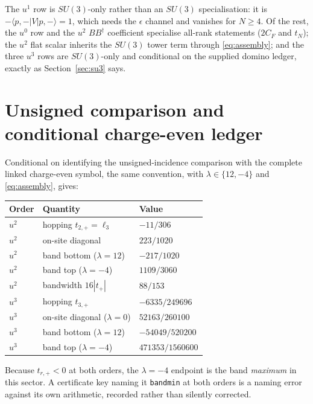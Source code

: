 \documentclass[11pt]{article}
\theoremstyle{plain}
\theoremstyle{definition}
\theoremstyle{remark}
\newcommand{\chk}[1]{}
\newcommand{\CF}{C_F}
\newcommand{\dg}{^{\dagger}}
\begin{document}
The $u^1$ row is $SU(3)$-only rather than an $SU(3)$ specialisation: it is
$-\langle p,-|V|p,-\rangle=1$, which needs the $\epsilon$ channel and vanishes
for $N\ge4$. Of the rest, the $u^0$ row and the $u^2$ $BB\dg$ coefficient
specialise all-rank statements ($2\CF$ and $t_N$); the $u^2$ flat scalar
inherits the $SU(3)$ tower term through \eqref{eq:assembly}; and the three
$u^3$ rows are $SU(3)$-only and conditional on the supplied domino ledger,
exactly as Section~\ref{sec:su3} says.

\section{Unsigned comparison and conditional charge-even ledger}\label{app:even}

Conditional on identifying the unsigned-incidence comparison with the complete
linked charge-even symbol, the same convention, with
$\lambda\in\{12,-4\}$ and \eqref{eq:assembly}, gives:

\begin{center}
\begin{tabular}{@{}lll@{}}
\toprule
Order & Quantity & Value\\
\midrule
$u^2$ & hopping $t_{2,+}=\ell_3$ & $-11/306$\\
$u^2$ & on-site diagonal & $223/1020$\\
$u^2$ & band bottom ($\lambda=12$) & $-217/1020$\\
$u^2$ & band top ($\lambda=-4$) & $1109/3060$\\
$u^2$ & bandwidth $16|t_+|$ & $88/153$\\
$u^3$ & hopping $t_{3,+}$ & $-6335/249696$\\
$u^3$ & on-site diagonal ($\lambda=0$) & $52163/260100$\\
$u^3$ & band bottom ($\lambda=12$) & $-54049/520200$\\
$u^3$ & band top ($\lambda=-4$) & $471353/1560600$\\
\bottomrule
\end{tabular}
\end{center}

\chk{one assembly formula gives every C-even value at both orders}

Because $t_{r,+}<0$ at both orders, the $\lambda=-4$ endpoint is the band
\emph{maximum} in this sector. A certificate key naming it \texttt{bandmin} at
both orders is a naming error against its own arithmetic, recorded rather than
silently corrected.
\chk{FINDING: the certificate key 'bandmin' holds the band MAXIMUM, at both orders}
\end{document}
